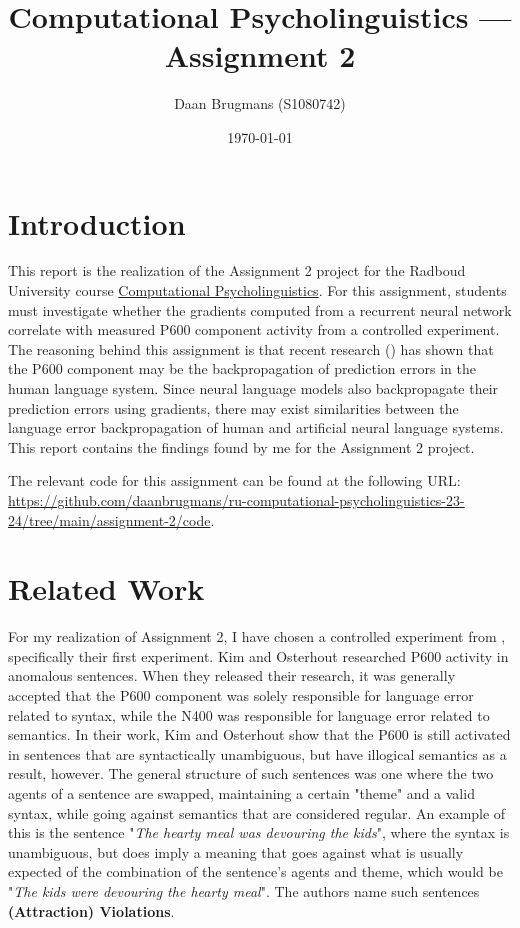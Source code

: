 \documentclass{IEEEtran}
\begin{document}
\title{Computational Psycholinguistics --- Assignment 2}
\author{Daan Brugmans (S1080742)}
\date{\today}

\graphicspath{{./images}}

\maketitle

\section{Introduction}
This report is the realization of the Assignment 2 project for the Radboud University course \href{https://www.ru.nl/courseguides/arts/courses/ma/rema-lc/let-rema-lcex28/}{Computational Psycholinguistics}.
For this assignment, students must investigate whether the gradients computed from a recurrent neural network correlate with measured P600 component activity from a controlled experiment.
The reasoning behind this assignment is that recent research (\cite{fitz2019erp,frank2024gradients}) has shown that the P600 component may be the backpropagation of prediction errors in the human language system.
Since neural language models also backpropagate their prediction errors using gradients, there may exist similarities between the language error backpropagation of human and artificial neural language systems.
This report contains the findings found by me for the Assignment 2 project.

The relevant code for this assignment can be found at the following URL: \url{https://github.com/daanbrugmans/ru-computational-psycholinguistics-23-24/tree/main/assignment-2/code}.

\section{Related Work}
For my realization of Assignment 2, I have chosen a controlled experiment from \cite{kim2005combinatory}, specifically their first experiment.
Kim and Osterhout researched P600 activity in anomalous sentences.
When they released their research, it was generally accepted that the P600 component was solely responsible for language error related to syntax, while the N400 was responsible for language error related to semantics.
In their work, Kim and Osterhout show that the P600 is still activated in sentences that are syntactically unambiguous, but have illogical semantics as a result, however.
The general structure of such sentences was one where the two agents of a sentence are swapped, maintaining a certain "theme" and a valid syntax, while going against semantics that are considered regular.
An example of this is the sentence "\textit{The hearty meal was devouring the kids}", where the syntax is unambiguous, but does imply a meaning that goes against what is usually expected of the combination of the sentence's agents and theme, which would be "\textit{The kids were devouring the hearty meal}".
The authors name such sentences \textbf{(Attraction) Violations}.
\end{document}
